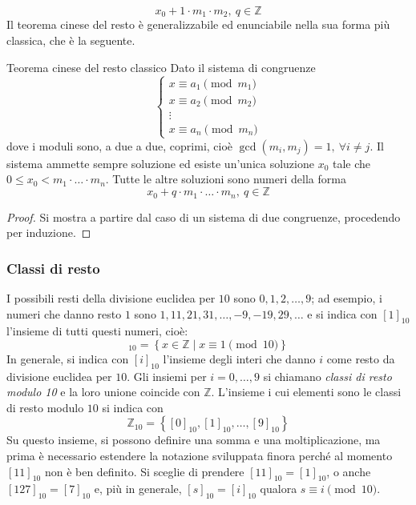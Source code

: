 \documentclass[11pt, a4paper]{scrartcl}
\theoremstyle{definition}
\numberwithin{esempio}{section}
\theoremstyle{definition}
\numberwithin{obs}{section}
\numberwithin{nota}{section}
\numberwithin{equation}{subsection}
\begin{document}
\begin{equation}
x_0 + 1 \cdot m_1\cdot m_2, \ q \in \mathbb{Z}
\end{equation}
Il teorema cinese del resto \`e generalizzabile ed enunciabile nella sua forma pi\`u classica, che \`e la seguente.
\begin{teorema}
	{Teorema cinese del resto classico}{}
Dato il sistema di congruenze
\[
\begin{cases}
	x \equiv a_1 \pmod{m_1} \\
	x \equiv a_2 \pmod{m_2} \\
	\vdots\\
	x\equiv a_n \pmod{m_n} 
\end{cases}
\] 
dove i moduli sono, a due a due, coprimi, cio\`e $\operatorname{gcd}(m_i,m_j) =1, \ \forall i\neq j$.
Il sistema ammette sempre soluzione ed esiste un'unica soluzione $x_0$ tale che $0\le x_0 < m_1 \cdot \ldots \cdot m_n$. 
Tutte le altre soluzioni sono numeri della forma
\[
x_0 + q \cdot  m_1 \cdot  \ldots \cdot  m_n, \ q \in \mathbb{Z}
\] 
\begin{proof}
Si mostra a partire dal caso di un sistema di due congruenze, procedendo per induzione.
\end{proof}
\end{teorema}

\subsubsection{Classi di resto}
I possibili resti della divisione euclidea per $10$ sono $0,1,2,\ldots, 9$; ad esempio, i numeri che danno resto $1$ sono $1,11,21,31,\ldots,-9,-19,29,\ldots$ e si indica con $[1]_{10} $ l'insieme di tutti questi numeri, cio\`e:
\begin{equation}
	[1]_{10} = \left\{ x \in \mathbb{Z}  \mid x\equiv 1 \pmod{10}  \right\} 
\end{equation}
In generale, si indica con $[i]_{10} $ l'insieme degli interi che danno $i$ come resto da divisione euclidea per $10$.
Gli insiemi per $i=0,\ldots,9$ si chiamano \textit{classi di resto modulo 10} e la loro unione coincide con $\mathbb{Z} $. 
L'insieme i cui elementi sono le classi di resto modulo $10$ si indica con 
\begin{equation}
	\mathbb{Z}_{10} = \left\{ [0]_{10} , [1]_{10} , \ldots, [9]_{10}  \right\} 
\end{equation}
Su questo insieme, si possono definire una somma e una moltiplicazione, ma prima \`e necessario estendere la notazione sviluppata finora perch\'e al momento $[11]_{10} $ non \`e ben definito.
Si sceglie di prendere $[11]_{10} = [1]_{10} $, o anche $[127]_{10} = [7]_{10} $ e, pi\`u in generale, $[s]_{10} = [i]_{10} $ qualora $s\equiv i \pmod{10} $.
\end{document}
